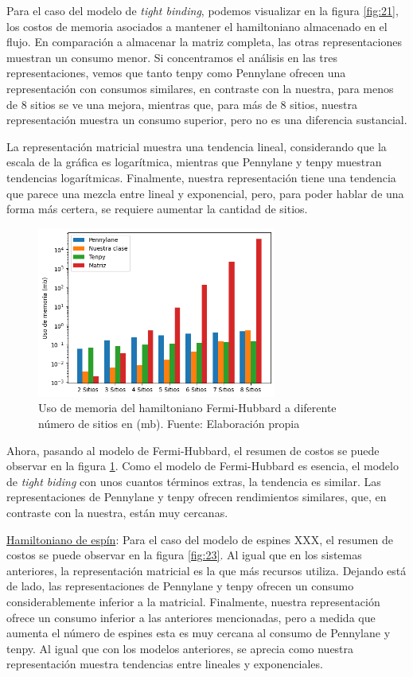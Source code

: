Para el caso del modelo de \textit{tight binding}, podemos visualizar en la figura \ref{fig:21}, los costos de memoria asociados a mantener el hamiltoniano almacenado en el flujo. En comparación a almacenar la matriz completa, las otras representaciones muestran un consumo menor. Si concentramos el análisis en las tres representaciones, vemos que tanto tenpy como Pennylane ofrecen una representación con consumos similares, en contraste con la nuestra, para menos de 8 sitios se ve una mejora, mientras que, para más de 8 sitios, nuestra representación muestra un consumo superior, pero no es una diferencia sustancial. 

La representación matricial muestra una tendencia lineal, considerando que la escala de la gráfica es logarítmica, mientras que Pennylane y tenpy muestran tendencias logarítmicas. Finalmente, nuestra representación tiene una tendencia que parece una mezcla entre lineal y exponencial, pero, para poder hablar de una forma más certera, se requiere aumentar la cantidad de sitios.

\begin{figure}[H]
\centering
\includegraphics[width=0.7\textwidth]{figures/S4/fermi/usomemoriafh.png}
\caption{\label{fig:22} Uso de memoria del hamiltoniano Fermi-Hubbard a diferente número de sitios en (mb). Fuente: Elaboración propia}
\end{figure}


Ahora, pasando al modelo de Fermi-Hubbard, el resumen de costos se puede observar en la figura \ref{fig:22}. Como el modelo de Fermi-Hubbard es esencia, el modelo de \textit{tight biding} con unos cuantos términos extras, la tendencia es similar. Las representaciones de Pennylane y tenpy ofrecen rendimientos similares, que, en contraste con la nuestra, están muy cercanas.


\underline{Hamiltoniano de espín}:
Para el caso del modelo de espines XXX, el resumen de costos se puede observar en la figura \ref{fig:23}. Al igual que en los sistemas anteriores, la representación matricial es la que más recursos utiliza. Dejando está de lado, las representaciones de Pennylane y tenpy ofrecen un consumo considerablemente inferior a la matricial. Finalmente, nuestra representación ofrece un consumo inferior a las anteriores mencionadas, pero a medida que aumenta el número de espines esta es muy cercana al consumo de Pennylane y tenpy. Al igual que con los modelos anteriores, se aprecia como nuestra representación muestra tendencias entre lineales y exponenciales.



